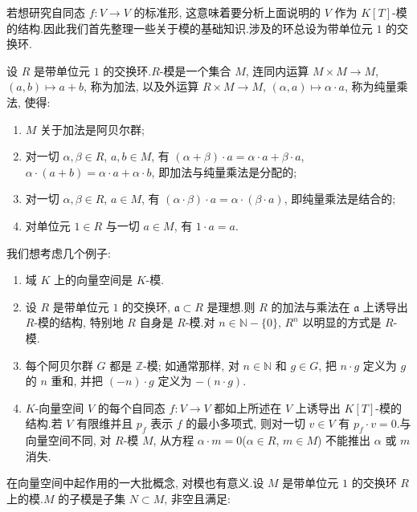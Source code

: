若想研究自同态 $f \colon V \longrightarrow V$ 的标准形, 这意味着要分析上面说明的 $V$ 作为 $K[T]$-模的结构.因此我们首先整理一些关于模的基础知识.涉及的环总设为带单位元 $1$ 的交换环.

\begin{definition}[模]\label{def:6.3.1}
设 $R$ 是带单位元 $1$ 的交换环.$R$-模是一个集合 $M$, 连同内运算 $M \times M \longrightarrow M$, $(a, b) \longmapsto a + b$, 称为加法, 以及外运算 $R \times M \longrightarrow M$, $(\alpha, a) \longmapsto \alpha \cdot a$, 称为纯量乘法, 使得:
\begin{enumerate}
\item[(i)] $M$ 关于加法是阿贝尔群;
\item[(ii)] 对一切 $\alpha, \beta \in R$, $a, b \in M$, 有 $(\alpha + \beta) \cdot a = \alpha \cdot a + \beta \cdot a$, $\alpha \cdot (a + b) = \alpha \cdot a + \alpha \cdot b$, 即加法与纯量乘法是分配的;
\item[(iii)] 对一切 $\alpha, \beta \in R$, $a \in M$, 有 $(\alpha \cdot \beta) \cdot a = \alpha \cdot (\beta \cdot a)$, 即纯量乘法是结合的;
\item[(iv)] 对单位元 $1 \in R$ 与一切 $a \in M$, 有 $1 \cdot a = a$.
\end{enumerate}
\end{definition}

我们想考虑几个例子:
\begin{enumerate}
\item 域 $K$ 上的向量空间是 $K$-模.
\item 设 $R$ 是带单位元 $1$ 的交换环, $\mathfrak{a} \subset R$ 是理想.则 $R$ 的加法与乘法在 $\mathfrak{a}$ 上诱导出 $R$-模的结构, 特别地 $R$ 自身是 $R$-模.对 $n \in \mathbb{N} - \{0\}$, $R^n$ 以明显的方式是 $R$-模.
\item 每个阿贝尔群 $G$ 都是 $\mathbb{Z}$-模; 如通常那样, 对 $n \in \mathbb{N}$ 和 $g \in G$, 把 $n \cdot g$ 定义为 $g$ 的 $n$ 重和, 并把 $(-n) \cdot g$ 定义为 $-(n \cdot g)$.
\item $K$-向量空间 $V$ 的每个自同态 $f \colon V \longrightarrow V$ 都如上所述在 $V$ 上诱导出 $K[T]$-模的结构.若 $V$ 有限维并且 $p_f$ 表示 $f$ 的最小多项式, 则对一切 $v \in V$ 有 $p_f \cdot v = 0$.与向量空间不同, 对 $R$-模 $M$, 从方程 $\alpha \cdot m = 0$($\alpha \in R$, $m \in M$) 不能推出 $\alpha$ 或 $m$ 消失.
\end{enumerate}

在向量空间中起作用的一大批概念, 对模也有意义.设 $M$ 是带单位元 $1$ 的交换环 $R$ 上的模.$M$ 的子模是子集 $N \subset M$, 非空且满足:

